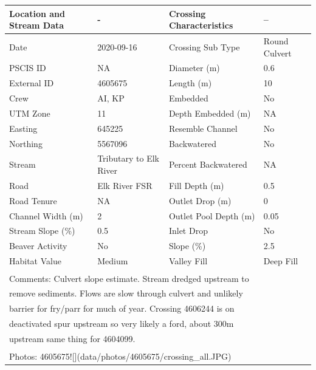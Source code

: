 \documentclass[
]{book}
\begin{document}
\begin{tabular}{llll}
\toprule
Location and Stream Data & - & Crossing Characteristics & --\\
\midrule
Date & 2020-09-16 & Crossing Sub Type & Round Culvert\\
PSCIS ID & NA & Diameter (m) & 0.6\\
External ID & 4605675 & Length (m) & 10\\
Crew & AI, KP & Embedded & No\\
UTM Zone & 11 & Depth Embedded (m) & NA\\
\addlinespace
Easting & 645225 & Resemble Channel & No\\
Northing & 5567096 & Backwatered & No\\
Stream & Tributary to Elk River & Percent Backwatered & NA\\
Road & Elk River FSR & Fill Depth (m) & 0.5\\
Road Tenure & NA & Outlet Drop (m) & 0\\
\addlinespace
Channel Width (m) & 2 & Outlet Pool Depth (m) & 0.05\\
Stream Slope (\%) & 0.5 & Inlet Drop & No\\
Beaver Activity & No & Slope (\%) & 2.5\\
Habitat Value & Medium & Valley Fill & Deep Fill\\
\bottomrule
\multicolumn{4}{l}{\textsuperscript{} Comments: Culvert slope estimate. Stream dredged upstream to}\\
\multicolumn{4}{l}{remove sediments. Flows are slow through culvert and unlikely}\\
\multicolumn{4}{l}{barrier for fry/parr for much of year. Crossing 4606244 is on}\\
\multicolumn{4}{l}{deactivated spur upstream so very likely a ford, about 300m}\\
\multicolumn{4}{l}{upstream same thing for 4604099.}\\
\multicolumn{4}{l}{\textsuperscript{} Photos: 4605675![](data/photos/4605675/crossing\_all.JPG)}\\
\end{tabular}
\end{document}
